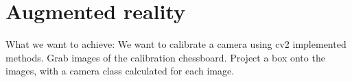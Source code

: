 \section{Augmented reality}

What we want to achieve:
We want to calibrate a camera using cv2 implemented methods.
Grab images of the calibration chessboard.
Project a box onto the images, with a camera class calculated for each
image. 













